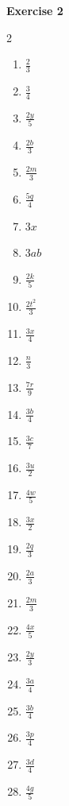\documentclass[12pt]{article}
\begin{document}
\textbf{Exercise 2}
\begin{multicols}{2}
\begin{enumerate}
\item $\tfrac{2}{3}$
\item $\tfrac{3}{4}$
\item $\tfrac{2y}{5}$
\item $\tfrac{2b}{3}$
\item $\tfrac{2m}{3}$
\item $\tfrac{5q}{4}$
\item $3x$
\item $3ab$
\item $\tfrac{2k}{5}$
\item $\tfrac{2t^{2}}{3}$
\item $\tfrac{3x}{4}$
\item $\tfrac{n}{3}$
\item $\tfrac{7r}{9}$
\item $\tfrac{3b}{4}$
\item $\tfrac{3c}{7}$
\item $\tfrac{3u}{2}$
\item $\tfrac{4w}{5}$
\item $\tfrac{3x}{2}$
\item $\tfrac{2q}{3}$
\item $\tfrac{2a}{3}$
\item $\tfrac{2m}{3}$    %
\item $\tfrac{4x}{5}$
\item $\tfrac{2y}{3}$
\item $\tfrac{3a}{4}$
\item $\tfrac{3b}{4}$
\item $\tfrac{3p}{4}$
\item $\tfrac{3d}{4}$
\item $\tfrac{4g}{5}$
\end{enumerate}
\end{multicols}
\end{document}

